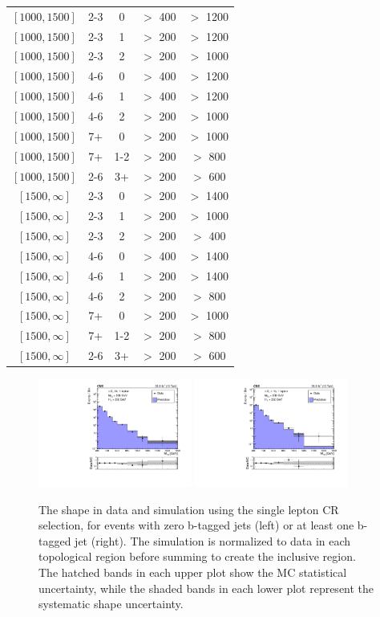 \begin{table}
\begin{tabular}{c|c|c|c|c}
$[1000,1500]$ &2-3&0& $>$ 400& $>$ 1200\\
$[1000,1500]$ &2-3&1& $>$ 200& $>$ 1200\\
$[1000,1500]$ &2-3&2& $>$ 200& $>$ 1000\\
$[1000,1500]$ &4-6&0& $>$ 400& $>$ 1200\\
$[1000,1500]$ &4-6&1& $>$ 400& $>$ 1200\\
$[1000,1500]$ &4-6&2& $>$ 200& $>$ 1000\\
$[1000,1500]$ &7+&0& $>$ 200& $>$ 1000\\
$[1000,1500]$ &7+&1-2& $>$ 200& $>$ 800\\
$[1000,1500]$ &2-6&3+& $>$ 200& $>$ 600\\
$[1500,\infty]$ &2-3&0& $>$ 200& $>$ 1400\\
$[1500,\infty]$ &2-3&1& $>$ 200& $>$ 1000\\
$[1500,\infty]$ &2-3&2& $>$ 200& $>$ 400\\
$[1500,\infty]$ &4-6&0& $>$ 400& $>$ 1400\\
$[1500,\infty]$ &4-6&1& $>$ 200& $>$ 1400\\
$[1500,\infty]$ &4-6&2& $>$ 200& $>$ 800\\
$[1500,\infty]$ &7+&0& $>$ 200& $>$ 1000\\
$[1500,\infty]$ &7+&1-2& $>$ 200& $>$ 800\\
$[1500,\infty]$ &2-6&3+& $>$ 200& $>$ 600\\
\hline \hline
	\end{tabular}
	\label{tbl:lostlepHybridPoint}
\end{table}
\begin{figure}
	\centering
	\includegraphics[width=0.45\textwidth]{backgrounds/figs/lostlepHybrid_0b_mt2bins.pdf}
	\includegraphics[width=0.45\textwidth]{backgrounds/figs/lostlepHybrid_ge1b_mt2bins}
	\caption{The \mttwo shape in data and simulation using the single lepton CR selection, for events with zero b-tagged jets (left) or at least one b-tagged jet (right). The simulation is normalized to data in each topological region before summing to create the inclusive region. The hatched bands in each upper plot show the MC statistical uncertainty, while the shaded bands in each lower plot represent the systematic shape uncertainty.}
	\label{fig:lostlepHybrid}
\end{figure}

